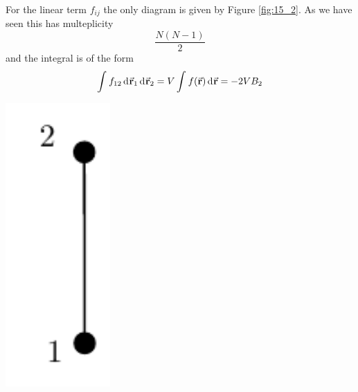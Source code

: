 \documentclass[../../Main/Main.tex]{subfiles}
\begin{document}
\begin{minipage}[c]{0.7\linewidth}
For the linear term \( f_{ij} \) the only diagram is given by Figure \ref{fig:15_2}. As we have seen this has multeplicity
\begin{equation*}
\frac{N(N-1)}{2}
\end{equation*}
and the integral is of the form
\begin{equation*}
  \int_{}^{}  f_{12} \dd[]{\va{r}_1} \dd[]{\va{r}_2}  = V \int_{}^{} f(\va{r}) \dd[]{\va{r}}  = - 2 V B_2
\end{equation*}
\end{minipage}
\begin{minipage}[]{0.3\linewidth}
\centering
\includegraphics[width=0.3\textwidth]{./img/5__1.pdf}
\end{minipage}
\end{document}
